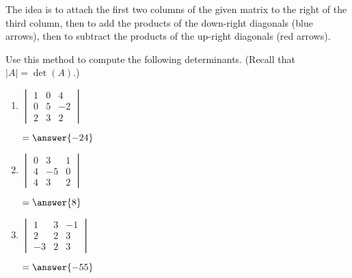 \documentclass{ximera}
\begin{document}
\begin{exercise}
\begin{image}
  \end{image}

  The idea is to attach the first two columns of the given matrix to the
  right of the third column, then to add the products of the down-right
  diagonals (blue  arrows), then to subtract the products of the
  up-right diagonals (red arrows).

  Use this method to compute the following determinants. (Recall that
  $|A| = \det(A)$.)

  \begin{enumerate}
  \item
    $\begin{vmatrix}
      1 & 0 & 4 \\
      0 & 5 & -2 \\
      2 & 3 & 2
    \end{vmatrix}$ \begin{prompt} $= \answer{-24}$ \end{prompt}

  \item
    $\begin{vmatrix}
      0 & 3 & 1 \\
      4 & -5 & 0 \\
      4 & 3 & 2
    \end{vmatrix}$ \begin{prompt} $= \answer{8}$ \end{prompt}

  \item
    $\begin{vmatrix}
      1 & 3 & -1 \\
      2 & 2 & 3 \\
      -3 & 2 & 3
    \end{vmatrix}$ \begin{prompt} $= \answer{-55}$ \end{prompt}


\end{enumerate}
\end{exercise}
\end{document}
